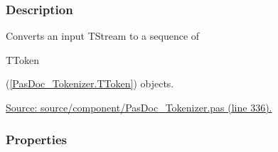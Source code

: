 \documentclass{report}
\begin{document}
\subsubsection*{\large{\textbf{Description}}\normalsize\hspace{1ex}\hfill}
Converts an input TStream to a sequence of \begin{ttfamily}TToken\end{ttfamily}(\ref{PasDoc_Tokenizer.TToken}) objects.\par
\href{https://github.com/pasdoc/pasdoc/blob/master/source/component/PasDoc_Tokenizer.pas#L336}{Source: source/component/PasDoc{\_}Tokenizer.pas (line 336).}\subsubsection*{\large{\textbf{Properties}}\normalsize\hspace{1ex}\hfill}
\end{document}
